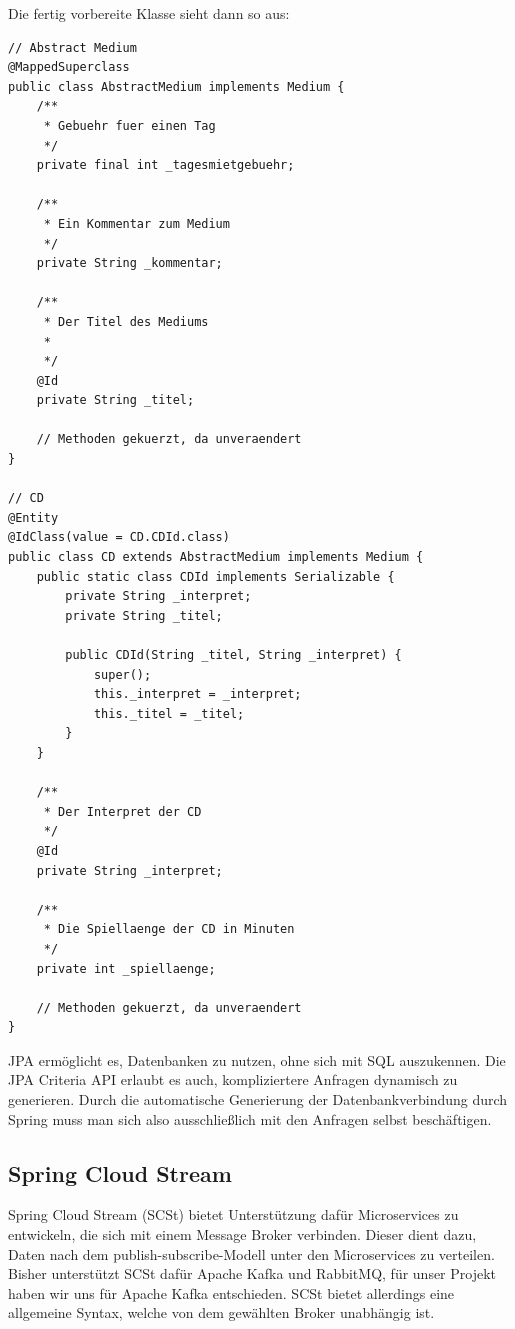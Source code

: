 \documentclass{article}
\begin{document}
Die fertig vorbereite Klasse sieht dann so aus:

\begin{lstlisting}
// Abstract Medium
@MappedSuperclass
public class AbstractMedium implements Medium {
    /**
     * Gebuehr fuer einen Tag
     */
    private final int _tagesmietgebuehr;

    /**
     * Ein Kommentar zum Medium
     */
    private String _kommentar;

    /**
     * Der Titel des Mediums
     *
     */
    @Id
    private String _titel;

    // Methoden gekuerzt, da unveraendert
}

// CD
@Entity
@IdClass(value = CD.CDId.class)
public class CD extends AbstractMedium implements Medium {
    public static class CDId implements Serializable {
        private String _interpret;
        private String _titel;

        public CDId(String _titel, String _interpret) {
            super();
            this._interpret = _interpret;
            this._titel = _titel;
        }
    }

    /**
     * Der Interpret der CD
     */
    @Id
    private String _interpret;

    /**
     * Die Spiellaenge der CD in Minuten
     */
    private int _spiellaenge;

    // Methoden gekuerzt, da unveraendert
}
\end{lstlisting}

JPA ermöglicht es, Datenbanken zu nutzen, ohne sich mit SQL auszukennen.
Die JPA Criteria API erlaubt es auch, kompliziertere Anfragen dynamisch zu generieren.
Durch die automatische Generierung der Datenbankverbindung durch Spring muss man sich also ausschließlich mit den Anfragen selbst beschäftigen.

\subsection{Spring Cloud Stream}

Spring Cloud Stream (SCSt) bietet Unterstützung dafür Microservices zu entwickeln, die sich mit einem Message Broker verbinden.
Dieser dient dazu, Daten nach dem publish-subscribe-Modell unter den Microservices zu verteilen.
Bisher unterstützt SCSt dafür Apache Kafka und RabbitMQ, für unser Projekt haben wir uns für Apache Kafka entschieden.
SCSt bietet allerdings eine allgemeine Syntax, welche von dem gewählten Broker unabhängig ist.
\end{document}
